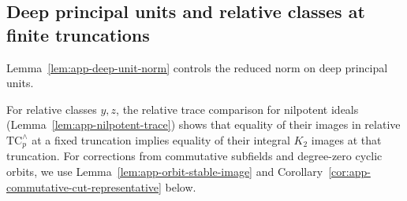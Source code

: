 \subsection{Deep principal units and relative classes at finite truncations}\label{app:second-deep-units}
Lemma~\ref{lem:app-deep-unit-norm} controls the reduced norm on deep principal units.

For relative classes $y,z$, the relative trace comparison for nilpotent ideals (Lemma~\ref{lem:app-nilpotent-trace}) shows that equality of their images in relative $\mathrm{TC}^\wedge_p$ at a fixed truncation implies equality of their integral $K_2$ images at that truncation.
For corrections from commutative subfields and degree-zero cyclic orbits, we use Lemma~\ref{lem:app-orbit-stable-image} and Corollary~\ref{cor:app-commutative-cut-representative} below.

